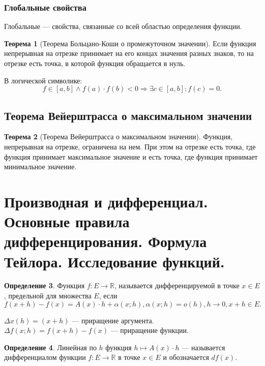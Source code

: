 \documentclass[12pt]{report}
\theoremstyle{definition}
\newtheorem{theorem}{Теорема}[chapter]
\newtheorem{definition}[theorem]{Определение}
\newcommand{\R}{\mathbb R}
\begin{document}
\subsubsection{Глобальные свойства}
Глобальные --- свойства, связанные со всей областью определения функции.

\begin{theorem}[Теорема Больцано-Коши о промежуточном значении]
Если функция непрерывная на отрезке принимает на его концах
значения разных знаков, то на отрезке есть точка, в которой
функция обращается в нуль.

В логической символике:
$$
f \in [a, b] \land f(a) \cdot f(b) < 0 \Rightarrow \exists c \in [a, b]: f(c) = 0.
$$
\end{theorem}

\subsection{Теорема Вейерштрасса о максимальном значении}
\begin{theorem}[Теорема Вейерштрасса о максимальном значении]
Функция, непрерывная на отрезке, ограничена на нем.
При этом на отрезке есть точка, где функция принимает максимальное
значение и есть точка, где функция принимает минимальное значение.
\end{theorem}


\section{Производная и дифференциал. Основные правила дифференцирования. Формула Тейлора. Исследование функций.}

\begin{definition}
Функция $f: E \rightarrow \R$, называется дифференцируемой в точке
$x \in E$, предельной для множества $E$, если
$$
f(x + h) - f(x) = A(x) \cdot h + \alpha(x; h), \alpha(x; h) = o(h), h \rightarrow 0, x + h \in E.
$$ 
\end{definition}

$\Delta x(h) = (x + h)$ --- приращение аргумента.
$\Delta f(x; h) = f(x + h) - f(x)$ --- приращение функции.

\begin{definition}
Линейная по $h$ функция $h \mapsto A(x) \cdot h$ --- называется дифференциалом
функции $f: E \rightarrow \R$ в точке $x \in E$ и обозначается $df(x)$.
\end{definition}
\end{document}

